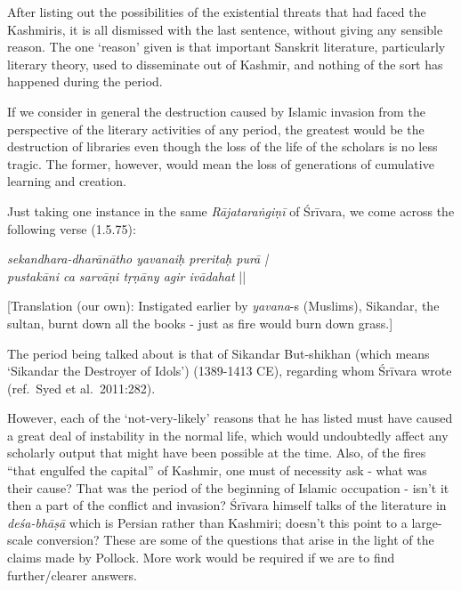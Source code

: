 After listing out the possibilities of the existential threats that had faced the Kashmiris, it is all dismissed with the last sentence, without giving any sensible reason. The one ‘reason’ given is that important Sanskrit literature, particularly literary theory, used to disseminate out of Kashmir, and nothing of the sort has happened during the period. 

If we consider in general the destruction caused by Islamic invasion from the perspective of the literary activities of any period, the greatest would be the destruction of libraries even though the loss of the life of the scholars is no less tragic. The former, however, would mean the loss of generations of cumulative learning and creation. 

Just taking one instance in the same {\sl Rājataraṅgiṇī} of Śrīvara, we come across the following verse (1.5.75):
\begin{myquote}
{\sl sekandhara-dharānātho yavanaiḥ preritaḥ purā |} \\
{\sl pustakāni ca sarvāṇi tṛṇāny agir ivādahat} || 
\end{myquote}

[Translation (our own): Instigated earlier by {\sl yavana}-s (Muslims), Sikandar, the sultan, burnt down all the books - just as fire would burn down grass.]

The period being talked about is that of Sikandar But-shikhan (which means ‘Sikandar the Destroyer of Idols’) (1389-1413 CE), regarding whom Śrīvara wrote (ref.\ Syed et al.\ 2011:282).

However, each of the ‘not-very-likely’ reasons that he has listed must have caused a great deal of instability in the normal life, which would undoubtedly affect any scholarly output that might have been possible at the time. Also, of the fires “that engulfed the capital” of Kashmir, one must of necessity ask - what was their cause? That was the period of the beginning of Islamic occupation - isn’t it then a part of the conflict and invasion? Śrīvara himself talks of the literature in {\sl deśa-bhāṣā} which is Persian rather than Kashmiri; doesn’t this point to a large-scale conversion? These are some of the questions that arise in the light of the claims made by Pollock. More work would be required if we are to find further/clearer answers.

